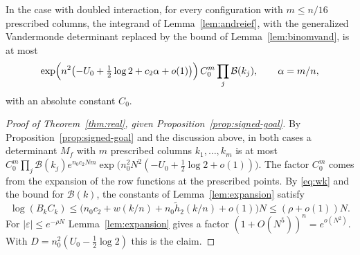 \begin{proposition}\label{prop:signed-goal}
In the case with doubled interaction, for every configuration with $m\le n/16$ prescribed columns, the
integrand of Lemma~\ref{lem:andreief}, with the generalized Vandermonde determinant replaced by the bound of
Lemma~\ref{lem:binomvand}, is at most
\[
 \exp\Bigl(n^2\bigl(-U_0+\tfrac12\log2+c_2\alpha+o(1)\bigr)\Bigr)\,C_0^m\prod_j\mathcal B(k_j),\qquad \alpha=m/n,
\]
with an absolute constant $C_0$.
\end{proposition}

\begin{proof}[Proof of Theorem~\ref{thm:real}, given Proposition~\ref{prop:signed-goal}]
By Proposition~\ref{prop:signed-goal} and the discussion above, in both cases a determinant $M_f$ with $m$
prescribed columns $k_1,\ldots,k_m$ is at most
$C_0^m\prod_j\mathcal B(k_j)e^{n_0c_2Nm}\exp\bigl(n_0^2N^2(-U_0+\frac12\log2+o(1))\bigr)$. The factor $C_0^m$ comes
from the expansion of the row functions at the prescribed points. By \eqref{eq:wk} and the bound for
$\mathcal B(k)$, the constants of Lemma~\ref{lem:expansion} satisfy
\[
 \log(B_kC_k)\le\bigl(n_0c_2+w(k/n)+n_0\tilde h_2(k/n)+o(1)\bigr)N\le(\rho+o(1))N .
\]
For $|\varepsilon|\le e^{-\rho N}$ Lemma~\ref{lem:expansion} gives a factor $(1+O(N^5))^n=e^{o(N^2)}$. With
$D=n_0^2(U_0-\frac12\log2)$ this is the claim.
\end{proof}
